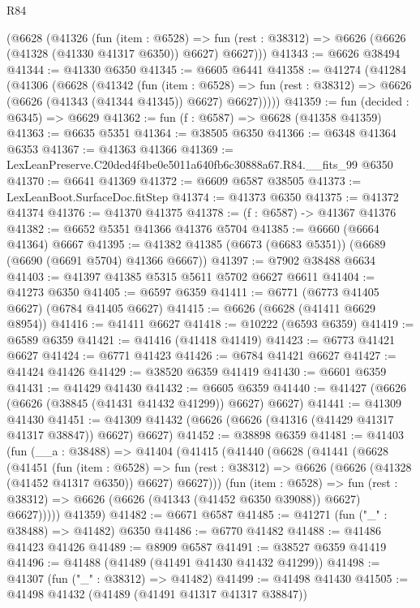 \begin{lexlean}{R84}
\begin{coremodule}
    (@6628
      (@41326
        (fun (item : @6528) =>
        fun (rest : @38312) => @6626 (@6626 (@41328 (@41330 @41317 @6350)) @6627) @6627)))
@41343 := @6626 @38494
@41344 := @41330 @6350
@41345 := @6605 @6441
@41358 := @41274
    (@41284
      (@41306
        (@6628
          (@41342
            (fun (item : @6528) =>
            fun (rest : @38312) => @6626 (@6626 (@41343 (@41344 @41345)) @6627) @6627)))))
@41359 := fun (decided : @6345) => @6629
@41362 := fun (f : @6587) => @6628 (@41358 @41359)
@41363 := @6635 @5351
@41364 := @38505 @6350
@41366 := @6348 @41364 @6353
@41367 := @41363 @41366
@41369 := LexLeanPreserve.C20ded4f4be0e5011a640fb6c30888a67.R84.__fits_99 @6350
@41370 := @6641 @41369
@41372 := @6609 @6587 @38505
@41373 := LexLeanBoot.SurfaceDoc.fitStep
@41374 := @41373 @6350
@41375 := @41372 @41374
@41376 := @41370 @41375
@41378 := (f : @6587) -> @41367 @41376
@41382 := @6652 @5351 @41366 @41376 @5704
@41385 := @6660 (@6664 @41364) @6667
@41395 := @41382 @41385 (@6673 (@6683 @5351)) (@6689 (@6690 (@6691 @5704) @41366 @6667))
@41397 := @7902 @38488 @6634
@41403 := @41397 @41385 @5315 @5611 @5702 @6627 @6611
@41404 := @41273 @6350
@41405 := @6597 @6359
@41411 := @6771 (@6773 @41405 @6627) (@6784 @41405 @6627)
@41415 := @6626 (@6628 (@41411 @6629 @8954))
@41416 := @41411 @6627
@41418 := @10222 (@6593 @6359)
@41419 := @6589 @6359
@41421 := @41416 (@41418 @41419)
@41423 := @6773 @41421 @6627
@41424 := @6771 @41423
@41426 := @6784 @41421 @6627
@41427 := @41424 @41426
@41429 := @38520 @6359 @41419
@41430 := @6601 @6359
@41431 := @41429 @41430
@41432 := @6605 @6359
@41440 := @41427 (@6626 (@6626 (@38845 (@41431 @41432 @41299)) @6627) @6627)
@41441 := @41309 @41430
@41451 := @41309 @41432 (@6626 (@6626 (@41316 (@41429 @41317 @41317 @38847)) @6627) @6627)
@41452 := @38898 @6359
@41481 := @41403
    (fun (__a : @38488) =>
    @41404
      (@41415
        (@41440
          (@6628
            (@41441
              (@6628
                (@41451
                  (fun (item : @6528) =>
                  fun (rest : @38312) => @6626 (@6626 (@41328 (@41452 @41317 @6350)) @6627) @6627)))
              (fun (item : @6528) =>
              fun (rest : @38312) => @6626 (@6626 (@41343 (@41452 @6350 @39088)) @6627) @6627)))))
      @41359)
@41482 := @6671 @6587
@41485 := @41271 (fun ("_" : @38488) => @41482) @6350
@41486 := @6770 @41482
@41488 := @41486 @41423 @41426
@41489 := @8909 @6587
@41491 := @38527 @6359 @41419
@41496 := @41488 (@41489 (@41491 @41430 @41432 @41299))
@41498 := @41307 (fun ("_" : @38312) => @41482)
@41499 := @41498 @41430
@41505 := @41498 @41432 (@41489 (@41491 @41317 @41317 @38847))

\end{coremodule}
\end{lexlean}
